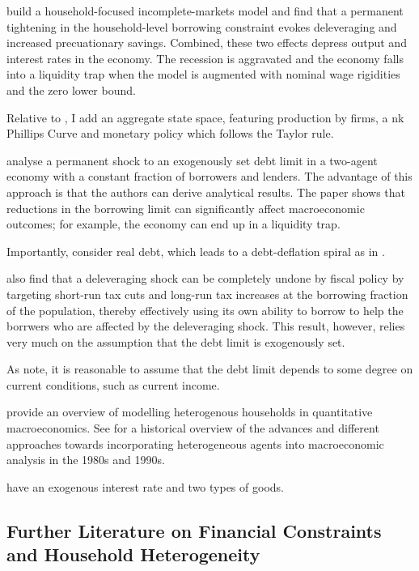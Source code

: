 \documentclass[12pt]{article} %
\numberwithin{equation}{section} %
\begin{document}
\textcite{gl2017} build a household-focused incomplete-markets model and find that a permanent tightening in the household-level borrowing constraint evokes deleveraging and increased precuationary savings. Combined, these two effects depress output and interest rates in the economy. The recession is aggravated and the economy falls into a liquidity trap when the model is augmented with nominal wage rigidities and the zero lower bound. 

Relative to \textcite{gl2017}, I add an aggregate state space, featuring production by firms, a \Gls{nk} Phillips Curve and monetary policy which follows the Taylor rule.

\textcite{egg2012} analyse a permanent shock to an exogenously set debt limit in a two-agent economy with a constant fraction of borrowers and lenders. The advantage of this approach is that the authors can derive analytical results. The paper shows that reductions in the borrowing limit can significantly affect macroeconomic outcomes; for example, the economy can end up in a liquidity trap.

Importantly, \textcite{egg2012} consider real debt, which leads to a debt-deflation spiral as in \textcite{fisher1933}.

\textcite{egg2012} also find that a deleveraging shock can be completely undone by fiscal policy by targeting short-run tax cuts and long-run tax increases at the borrowing fraction of the population, thereby effectively using its own ability to borrow to help the borrwers who are affected by the deleveraging shock. This result, however, relies very much on the assumption that the debt limit is exogenously set.

As \textcite{egg2012} note, it is reasonable to assume that the debt limit depends to some degree on current conditions, such as current income.

\textcite{heath2009} provide an overview of modelling heterogenous households in quantitative macroeconomics. See \textcite{cherrier2023} for a historical overview of the advances and different approaches towards incorporating heterogeneous agents into macroeconomic analysis in the 1980s and 1990s.

\textcite{riosrull2015} have an exogenous interest rate and two types of goods.

\subsection{Further Literature on Financial Constraints and Household Heterogeneity}
\label{sec:literature-more}
\end{document}
